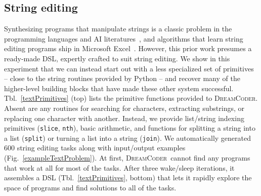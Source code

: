 \documentclass{article}
\newcommand{\system}{\textsc{DreamCoder}~}
\newcommand{\systemEnding}{\textsc{DreamCoder}}
\newcommand{\code}[1]{{\footnotesize\texttt{#1}}}
\begin{document}


\subsection{String editing}\label{textSection}
Synthesizing programs that manipulate strings is a classic problem in the
programming languages and AI literatures~\cite{menon2013machine,lau2001programming},
and algorithms that learn string editing programs ship in Microsoft Excel~\cite{gulwani2011automating}.
However, this prior work presumes a ready-made DSL,
expertly crafted to suit string editing.
We show in this experiment that we can instead start out with a
less specialized set of primitives -- close to the string routines provided by Python --
and recover many of the higher-level building blocks that have made these
other system successful.
Tbl.~\ref{textPrimitives} (top) lists the primitive functions provided to \systemEnding.
Absent are any routines for searching for characters, extracting substrings,
or replacing one character with another.
Instead, we provide list/string indexing primitives (\code{slice}, \code{nth}),
basic arithmetic, and functions for splitting a string into a list (\code{split})
or turning a list into a string (\code{join}).
We automatically generated  600 string editing tasks along with input/output examples (Fig.~\ref{exampleTextProblem}). %
At first, \system cannot find any programs that
work at all for most of the tasks.
After three wake/sleep iterations,
it assembles a DSL (Tbl.~\ref{textPrimitives}, bottom) that lets it rapidly explore the space of programs and find solutions to
all of the tasks.
\end{document}
